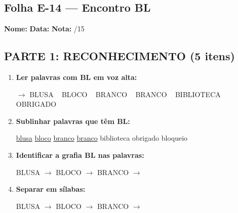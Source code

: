 \subsection{Folha E-14 --- Encontro BL}
\begin{exercicio}



\noindent\textbf{Nome:} \underline{\hspace{3.2cm}} \quad \textbf{Data:} \underline{\hspace{1.6cm}} \quad \textbf{Nota:} \underline{\hspace{0.9cm}}/15


\subsection*{PARTE 1: RECONHECIMENTO (5 itens)}

\begin{enumerate}

  \item \textbf{Ler palavras com BL em voz alta:}
  \begin{center}
  $\rightarrow$ BLUSA ~ BLOCO ~ BRANCO ~ BRANCO ~ BIBLIOTECA ~ OBRIGADO
  \end{center}

  \item \textbf{Sublinhar palavras que têm BL:}

\begin{center}
  \uline{blusa} \quad \uline{bloco} \quad \uline{branco} \quad \uline{branco} \quad biblioteca \quad obrigado \quad bloqueio
\end{center}

  \item \textbf{Identificar a grafia BL nas palavras:}
  \begin{center}
  BLUSA $\rightarrow$ \underline{\hspace{1cm}} \quad BLOCO $\rightarrow$ \underline{\hspace{1cm}} \quad BRANCO $\rightarrow$ \underline{\hspace{1cm}}
  \end{center}

  \item \textbf{Separar em sílabas:}
  \begin{center}
  BLUSA $\rightarrow$ \underline{\hspace{1.2cm}} \quad BLOCO $\rightarrow$ \underline{\hspace{1.2cm}} \quad BRANCO $\rightarrow$ \underline{\hspace{1.2cm}}
  \end{center}


\end{enumerate}
\end{exercicio}
